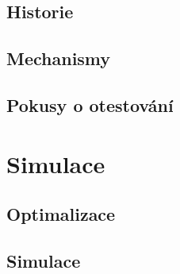\subsection{Historie}
\subsection{Mechanismy}
\subsection{Pokusy o otestování}

\section{Simulace}
\subsection{Optimalizace}
\subsection{Simulace}
